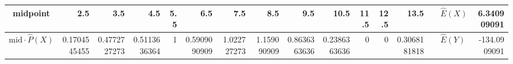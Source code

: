 \begin{table}[ht]
\begin{adjustbox}{width = \textwidth, center}
\begin{tabular}{|cc|r|r|r|r|r|r|r|r|r|r|r|r|r|r|r|}
        \multicolumn{2}{|c|}{\cellcolor[HTML]{FFF2CC}midpoint}                          & \cellcolor[HTML]{FFF2CC}2.5                    & \cellcolor[HTML]{FFF2CC}3.5                    & \cellcolor[HTML]{FFF2CC}4.5                    & \cellcolor[HTML]{FFF2CC}5.5                    & \cellcolor[HTML]{FFF2CC}6.5                    & \cellcolor[HTML]{FFF2CC}7.5                    & \cellcolor[HTML]{FFF2CC}8.5                    & \cellcolor[HTML]{FFF2CC}9.5                     & \cellcolor[HTML]{FFF2CC}10.5                    & \cellcolor[HTML]{FFF2CC}11.5                    & \cellcolor[HTML]{FFF2CC}12.5                    & \cellcolor[HTML]{FFF2CC}13.5                    & \multicolumn{1}{l|}{}                                                           & \multicolumn{1}{l|}{\cellcolor[HTML]{F9CB9C}$\widehat{E}(X)$}           & \cellcolor[HTML]{F9CB9C}6.340909091                                                              \\ \hline
        \multicolumn{2}{|c|}{\cellcolor[HTML]{FFF2CC}$\mathrm{mid}\cdot\widehat{P}(X)$} & \cellcolor[HTML]{FFF2CC}0.1704545455           & \cellcolor[HTML]{FFF2CC}0.4772727273           & \cellcolor[HTML]{FFF2CC}0.5113636364           & \cellcolor[HTML]{FFF2CC}1                      & \cellcolor[HTML]{FFF2CC}0.5909090909           & \cellcolor[HTML]{FFF2CC}1.022727273            & \cellcolor[HTML]{FFF2CC}1.159090909            & \cellcolor[HTML]{FFF2CC}0.8636363636            & \cellcolor[HTML]{FFF2CC}0.2386363636            & \cellcolor[HTML]{FFF2CC}0                       & \cellcolor[HTML]{FFF2CC}0                       & \cellcolor[HTML]{FFF2CC}0.3068181818            & \multicolumn{1}{l|}{}                                                           & \multicolumn{1}{l|}{\cellcolor[HTML]{F9CB9C}$\widehat{E}(Y)$}           & \cellcolor[HTML]{F9CB9C}-134.0909091                                                             \\ \hline
        \end{tabular}
    \end{adjustbox}
\end{table}
